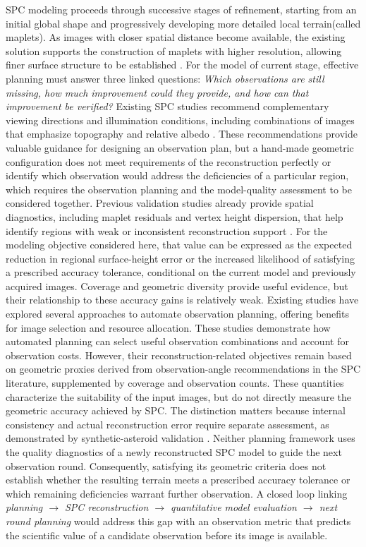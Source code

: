 SPC modeling proceeds through successive stages of refinement, starting from an initial global shape and progressively developing more detailed local terrain(called maplets). As images with closer spatial distance become available, the existing solution supports the construction of maplets with higher resolution, allowing finer surface structure to be established \citep{barnouin2020,palmer2022}. For the model of current stage, effective planning must answer three linked questions: \emph{Which observations are still missing, how much improvement could they provide, and how can that improvement be verified?} Existing SPC studies recommend complementary viewing directions and illumination conditions, including combinations of images that emphasize topography and relative albedo \citep{palmer2022,palmer2024geometry}. These recommendations provide valuable guidance for designing an observation plan, but a hand-made geometric configuration does not meet requirements of the reconstruction perfectly or identify which observation would address the deficiencies of a particular region, which requires the observation planning and the model-quality assessment to be considered together. Previous validation studies already provide spatial diagnostics, including maplet residuals and vertex height dispersion, that help identify regions with weak or inconsistent reconstruction support \citep{alasad2021,ernst2023}. For the modeling objective considered here, that value can be expressed as the expected reduction in regional surface-height error or the increased likelihood of satisfying a prescribed accuracy tolerance, conditional on the current model and previously acquired images. Coverage and geometric diversity provide useful evidence, but their relationship to these accuracy gains is relatively weak. Existing studies\citet{piccinin2022,wang2025,weirich2022} have explored several approaches to automate observation planning, offering benefits for image selection and resource allocation. These studies demonstrate how automated planning can select useful observation combinations and account for observation costs. However, their reconstruction-related objectives remain based on geometric proxies derived from observation-angle recommendations in the SPC literature, supplemented by coverage and observation counts. These quantities characterize the suitability of the input images, but do not directly measure the geometric accuracy achieved by SPC. The distinction matters because internal consistency and actual reconstruction error require separate assessment, as demonstrated by synthetic-asteroid validation \citep{weirich2022}. Neither planning framework uses the quality diagnostics of a newly reconstructed SPC model to guide the next observation round. Consequently, satisfying its geometric criteria does not establish whether the resulting terrain meets a prescribed accuracy tolerance or which remaining deficiencies warrant further observation. A closed loop linking \textit{planning $\rightarrow$ SPC reconstruction $\rightarrow$ quantitative model evaluation $\rightarrow$ next round planning} would address this gap with an observation metric that predicts the scientific value of a candidate observation before its image is available. 

